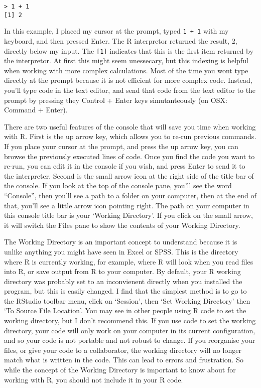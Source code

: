 \documentclass[]{book}
\begin{document}
\begin{verbatim}
> 1 + 1
[1] 2
\end{verbatim}

In this example, I placed my cursor at the prompt, typed
\texttt{1\ +\ 1} with my keyboard, and then pressed Enter. The R
interpretor returned the result, 2, directly below my input. The
\texttt{{[}1{]}} indicates that this is the first item returned by the
interpretor. At first this might seem unessecary, but this indexing is
helpful when working with more complex calculations. Most of the time
you wont type directly at the prompt because it is not efficient for
more complex code. Instead, you'll type code in the text editor, and
send that code from the text editor to the prompt by pressing they
Control + Enter keys simutanteously (on OSX: Command + Enter).

There are two useful features of the console that will save you time
when working with R. First is the up arrow key, which allows you to
re-run previous commands. If you place your cursor at the prompt, and
press the up arrow key, you can browse the previously executed lines of
code. Once you find the code you want to re-run, you can edit it in the
console if you wish, and press Enter to send it to the interpreter.
Second is the small arrow icon at the right side of the title bar of the
console. If you look at the top of the console pane, you'll see the word
``Console'', then you'll see a path to a folder on your computer, then
at the end of that, you'll see a little arrow icon pointing right. The
path on your computer in this console title bar is your `Working
Directory'. If you click on the small arrow, it will switch the Files
pane to show the contents of your Working Directory.

The Working Directory is an important concept to understand because it
is unlike anything you might have seen in Excel or SPSS. This is the
directory where R is currently working, for example, where R will look
when you read files into R, or save output from R to your computer. By
default, your R working directory was probably set to an inconvienent
directly when you installed the program, but this is easily changed. I
find that the simplest method is to go to the RStudio toolbar menu,
click on `Session', then `Set Working Directory' then `To Source File
Location'. You may see in other people using R code to set the working
directory, but I don't recommend this. If you use code to set the
working directory, your code will only work on your computer in its
current configuration, and so your code is not portable and not robust
to change. If you reorganise your files, or give your code to a
collaborator, the working directory will no longer match what is written
in the code. This can lead to errors and frustration. So while the
concept of the Working Directory is important to know about for working
with R, you should not include it in your R code.
\end{document}
